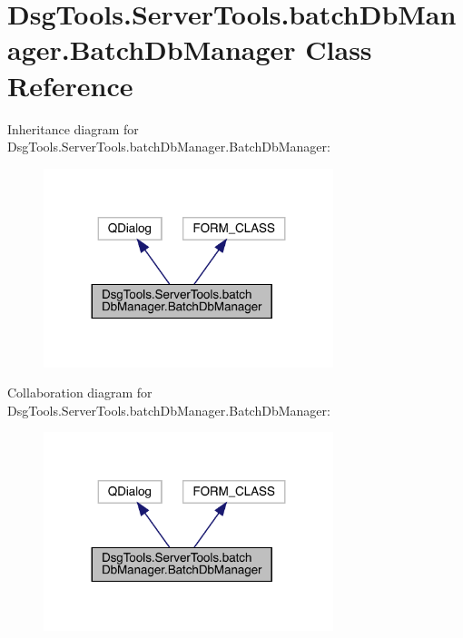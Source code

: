 \hypertarget{class_dsg_tools_1_1_server_tools_1_1batch_db_manager_1_1_batch_db_manager}{}\section{Dsg\+Tools.\+Server\+Tools.\+batch\+Db\+Manager.\+Batch\+Db\+Manager Class Reference}
\label{class_dsg_tools_1_1_server_tools_1_1batch_db_manager_1_1_batch_db_manager}


Inheritance diagram for Dsg\+Tools.\+Server\+Tools.\+batch\+Db\+Manager.\+Batch\+Db\+Manager\+:
\nopagebreak
\begin{figure}[H]
\begin{center}
\leavevmode
\includegraphics[width=239pt]{class_dsg_tools_1_1_server_tools_1_1batch_db_manager_1_1_batch_db_manager__inherit__graph}
\end{center}
\end{figure}


Collaboration diagram for Dsg\+Tools.\+Server\+Tools.\+batch\+Db\+Manager.\+Batch\+Db\+Manager\+:
\nopagebreak
\begin{figure}[H]
\begin{center}
\leavevmode
\includegraphics[width=239pt]{class_dsg_tools_1_1_server_tools_1_1batch_db_manager_1_1_batch_db_manager__coll__graph}
\end{center}
\end{figure}
